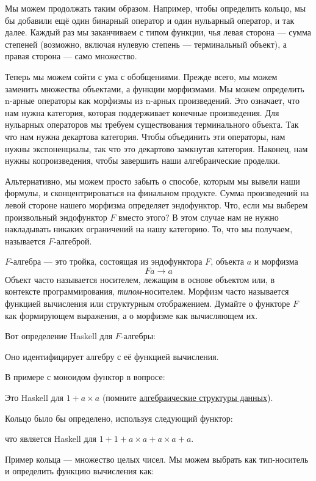 Мы можем продолжать таким образом. Например, чтобы определить кольцо, мы бы добавили ещё один
бинарный оператор и один нульарный оператор, и так далее. Каждый раз мы
заканчиваем с типом функции, чья левая сторона --- сумма степеней
(возможно, включая нулевую степень --- терминальный объект), а
правая сторона --- само множество.

Теперь мы можем сойти с ума с обобщениями. Прежде всего, мы можем заменить
множества объектами, а функции морфизмами. Мы можем определить n-арные
операторы как морфизмы из n-арных произведений. Это означает, что нам нужна
категория, которая поддерживает конечные произведения. Для нульарных операторов мы требуем
существования терминального объекта. Так что нам нужна декартова категория.
Чтобы объединить эти операторы, нам нужны экспоненциалы, так что это
декартово замкнутая категория. Наконец, нам нужны копроизведения, чтобы завершить наши
алгебраические проделки.

Альтернативно, мы можем просто забыть о способе, которым мы вывели наши формулы,
и сконцентрироваться на финальном продукте. Сумма произведений на левой
стороне нашего морфизма определяет эндофунктор. Что, если мы выберем
произвольный эндофунктор $F$ вместо этого? В этом случае нам не нужно
накладывать никаких ограничений на нашу категорию. То, что мы получаем, называется
$F$-алгеброй.

$F$-алгебра --- это тройка, состоящая из эндофунктора $F$,
объекта $a$ и морфизма
\[F a \to a\]
Объект часто называется носителем, лежащим в основе объектом или, в
контексте программирования, \emph{типом}-носителем. Морфизм часто
называется функцией вычисления или структурным отображением. Думайте о
функторе $F$ как формирующем выражения, а о морфизме как вычисляющем
их.

Вот определение Haskell для $F$-алгебры:

Оно идентифицирует алгебру с её функцией вычисления.

В примере с моноидом функтор в вопросе:

Это Haskell для $1 + a\times{}a$ (помните
\hyperref[simple-algebraic-data-types]{алгебраические
  структуры данных}).

Кольцо было бы определено, используя следующий функтор:

что является Haskell для $1 + 1 + a\times{}a + a\times{}a + a$.

Пример кольца --- множество целых чисел. Мы можем выбрать
 как тип-носитель и определить функцию вычисления
как:

